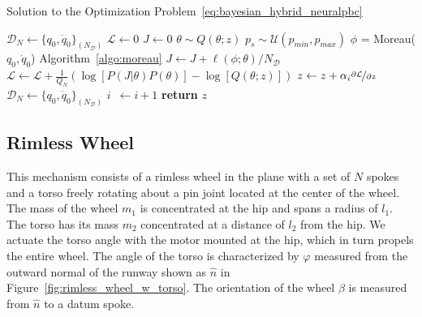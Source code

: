 \begin{algorithm}
    \caption{Solution to the Optimization Problem~\eqref{eq:bayesian_hybrid_neuralpbc}}
    \label{algo:bayes_neuralpbc}
    \small
    \begin{algorithmic}[1]
        \algrenewcommand\algorithmicindent{0em} %
        \State $\mathcal{D}_N \gets \{q_0, \dot{q}_0\}_{(N_{\mathcal{D}})}$   
        \algrenewcommand\algorithmicindent{1.1em} %
        \State $\mathcal{L} \gets 0$ 
         
        \State $J \gets 0$ 
        \State $\theta \sim Q(\theta; z)$ 
            \State $p_s \sim \mathcal{U}(p_{min}, p_{max})$
            \State $\phi$ = Moreau($q_0, \dot{q}_0$) \Comment Algorithm~\eqref{algo:moreau}
            \State $J \gets J + \ell(\phi; \theta)/N_{\mathcal{D}}$ 
          \EndFor
        \State $\mathcal{L} \gets \mathcal{L} + \frac{1}{Q_N} \left(\log[P(J | \theta) P(\theta)] - \log[Q(\theta;z)]\right)$
        \EndFor
        \State $z \gets z + \alpha_i \nicefrac{\partial \mathcal{L}}{\partial z}$
        \State $\mathcal{D}_N \gets \{q_0, \dot{q}_0\}_{(N_{\mathcal{D}})}$
        \State $i \;\:\gets i + 1$
        \EndWhile
        \State \textbf{return} $z$
    \end{algorithmic}
\end{algorithm}


\subsection{Rimless Wheel}
\label{sssec:rimless_wheel_model}

This mechanism consists of a rimless wheel in the plane with a set of $N$ spokes
and a torso freely rotating about a pin joint located at the center of the
wheel.
% 
The mass of the wheel $m_1$ is concentrated at the hip and spans a radius of
$l_1$.
%
The torso has its mass $m_2$ concentrated at a distance of $l_2$ from the hip. 
%
We actuate the torso angle with the motor mounted at the hip, which in turn
propels the entire wheel. 
%
The angle of the torso is characterized by $\varphi$ measured from the outward
normal of the runway shown as $\hat{n}$ in Figure~\ref{fig:rimless_wheel_w_torso}.  
%
The orientation of the wheel $\beta$ is measured from $\hat{n}$ to a datum spoke.
%

